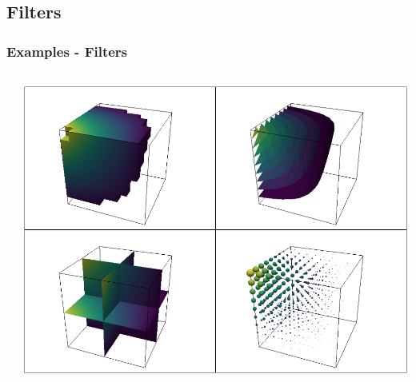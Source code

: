 \documentclass[t]{beamer}
\begin{document}
\subsection{Filters}
\begin{frame}
  \frametitle{Examples - Filters}
  \vspace{-10pt}

  \begin{center}
    \begin{columns}[T]
      \begin{column}{.5\textwidth}
        \inputminted[fontsize=\footnotesize]{python}{code/filters.py}
      \end{column}

      \begin{column}{.5\textwidth}
        \centering
        \includegraphics[width=1.0\textwidth]{figures/filters.png}
      \end{column}
    \end{columns}
  \end{center}

\end{frame}
\end{document}
